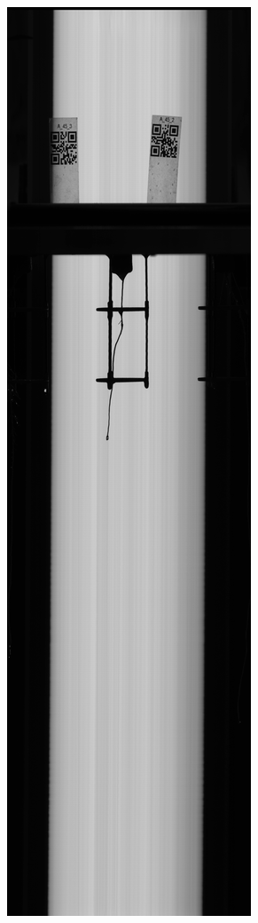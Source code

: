\begin{figure}
\centering
\begin{subfigure}[t]{.13\textwidth}
  \centering
  \includegraphics[width=\linewidth]{figures/NO_RS.jpg}

\end{subfigure}
\end{figure}

